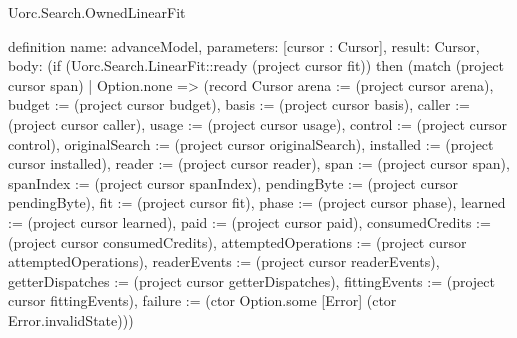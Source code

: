 \begin{lexlean}{Uorc.Search.OwnedLinearFit}
\begin{semanticmodule}
definition{
  name: advanceModel,
  parameters: [cursor : Cursor],
  result: Cursor,
  body: (if (Uorc.Search.LinearFit::ready (project cursor fit)) then (match (project cursor span)
    | Option.none => (record Cursor {arena := (project cursor arena), budget := (project cursor budget), basis := (project cursor basis), caller := (project cursor caller), usage := (project cursor usage), control := (project cursor control), originalSearch := (project cursor originalSearch), installed := (project cursor installed), reader := (project cursor reader), span := (project cursor span), spanIndex := (project cursor spanIndex), pendingByte := (project cursor pendingByte), fit := (project cursor fit), phase := (project cursor phase), learned := (project cursor learned), paid := (project cursor paid), consumedCredits := (project cursor consumedCredits), attemptedOperations := (project cursor attemptedOperations), readerEvents := (project cursor readerEvents), getterDispatches := (project cursor getterDispatches), fittingEvents := (project cursor fittingEvents), failure := (ctor Option.some [Error] (ctor Error.invalidState))})
}
\end{semanticmodule}
\end{lexlean}
